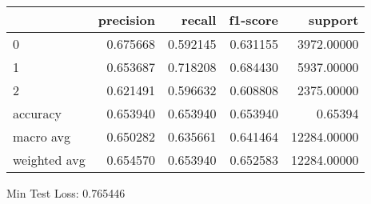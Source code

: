 \begin{tabular}{lrrrr}
\toprule
{} &  precision &    recall &  f1-score &      support \\
\midrule
0            &   0.675668 &  0.592145 &  0.631155 &   3972.00000 \\
1            &   0.653687 &  0.718208 &  0.684430 &   5937.00000 \\
2            &   0.621491 &  0.596632 &  0.608808 &   2375.00000 \\
accuracy     &   0.653940 &  0.653940 &  0.653940 &      0.65394 \\
macro avg    &   0.650282 &  0.635661 &  0.641464 &  12284.00000 \\
weighted avg &   0.654570 &  0.653940 &  0.652583 &  12284.00000 \\
\bottomrule
\end{tabular}

Min Test Loss: 0.765446